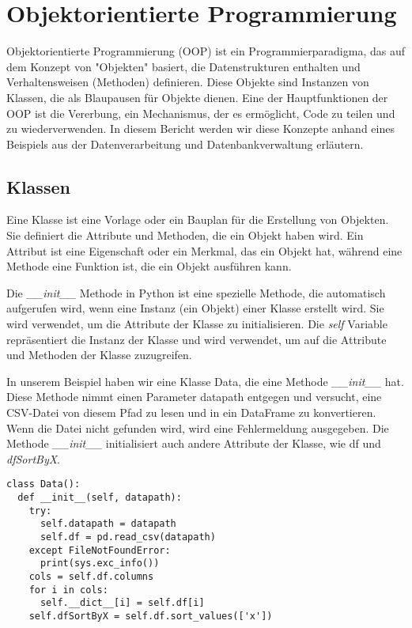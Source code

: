 \chapter{Objektorientierte Programmierung}

Objektorientierte Programmierung (OOP) ist ein Programmierparadigma, das auf dem Konzept von "Objekten" basiert, die Datenstrukturen enthalten und Verhaltensweisen (Methoden) definieren. Diese Objekte sind Instanzen von Klassen, die als Blaupausen für Objekte dienen. Eine der Hauptfunktionen der OOP ist die Vererbung, ein Mechanismus, der es ermöglicht, Code zu teilen und zu wiederverwenden. In diesem Bericht werden wir diese Konzepte anhand eines Beispiels aus der Datenverarbeitung und Datenbankverwaltung erläutern.

\section{Klassen}
Eine Klasse ist eine Vorlage oder ein Bauplan für die Erstellung von Objekten. Sie definiert die Attribute und Methoden, die ein Objekt haben wird. Ein Attribut ist eine Eigenschaft oder ein Merkmal, das ein Objekt hat, während eine Methode eine Funktion ist, die ein Objekt ausführen kann.

Die \textit{\_\_init\_\_} Methode in Python ist eine spezielle Methode, die automatisch aufgerufen wird, wenn eine Instanz (ein Objekt) einer Klasse erstellt wird. Sie wird verwendet, um die Attribute der Klasse zu initialisieren. Die \textit{self} Variable repräsentiert die Instanz der Klasse und wird verwendet, um auf die Attribute und Methoden der Klasse zuzugreifen.

In unserem Beispiel haben wir eine Klasse Data, die eine Methode \textit{\_\_init\_\_} hat. Diese Methode nimmt einen Parameter datapath entgegen und versucht, eine CSV-Datei von diesem Pfad zu lesen und in ein DataFrame zu konvertieren. Wenn die Datei nicht gefunden wird, wird eine Fehlermeldung ausgegeben. Die Methode \textit{\_\_init\_\_} initialisiert auch andere Attribute der Klasse, wie df und \textit{dfSortByX}.\\

\begin{lstlisting}[caption={class Data}, label={lst:class data}]
class Data():
  def __init__(self, datapath):
    try:
      self.datapath = datapath
      self.df = pd.read_csv(datapath)
    except FileNotFoundError:
      print(sys.exc_info())
    cols = self.df.columns
    for i in cols:
      self.__dict__[i] = self.df[i]
    self.dfSortByX = self.df.sort_values(['x'])
\end{lstlisting}

